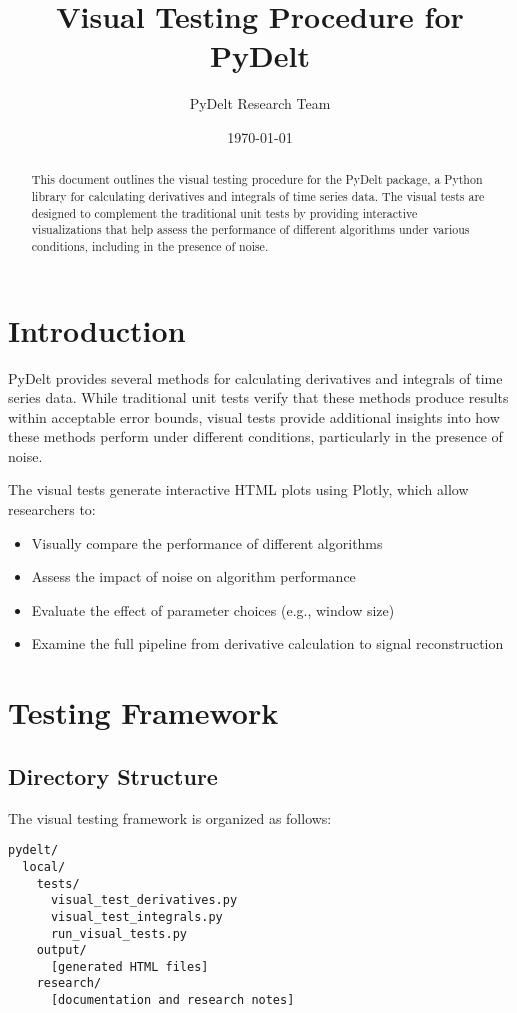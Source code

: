 \documentclass{article}
\title{Visual Testing Procedure for PyDelt}
\author{PyDelt Research Team}
\date{\today}
\begin{document}
\maketitle

\begin{abstract}
This document outlines the visual testing procedure for the PyDelt package, a Python library for calculating derivatives and integrals of time series data. The visual tests are designed to complement the traditional unit tests by providing interactive visualizations that help assess the performance of different algorithms under various conditions, including in the presence of noise.
\end{abstract}

\section{Introduction}

PyDelt provides several methods for calculating derivatives and integrals of time series data. While traditional unit tests verify that these methods produce results within acceptable error bounds, visual tests provide additional insights into how these methods perform under different conditions, particularly in the presence of noise.

The visual tests generate interactive HTML plots using Plotly, which allow researchers to:
\begin{itemize}
    \item Visually compare the performance of different algorithms
    \item Assess the impact of noise on algorithm performance
    \item Evaluate the effect of parameter choices (e.g., window size)
    \item Examine the full pipeline from derivative calculation to signal reconstruction
\end{itemize}

\section{Testing Framework}

\subsection{Directory Structure}

The visual testing framework is organized as follows:
\begin{lstlisting}
pydelt/
  local/
    tests/
      visual_test_derivatives.py
      visual_test_integrals.py
      run_visual_tests.py
    output/
      [generated HTML files]
    research/
      [documentation and research notes]
\end{lstlisting}
\end{document}
